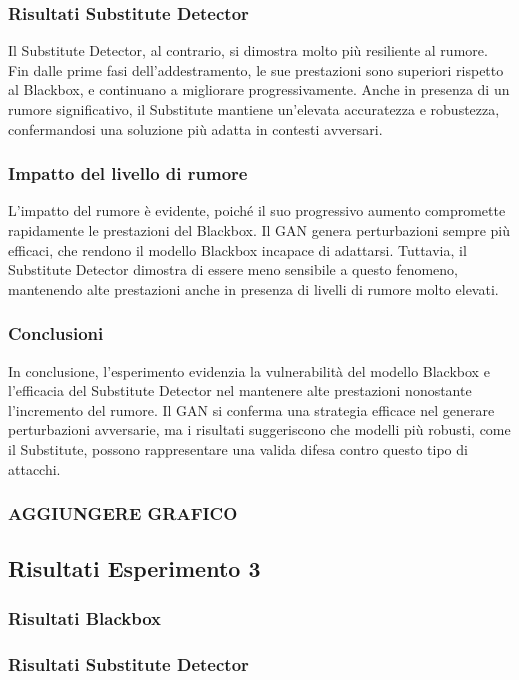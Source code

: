 \subsubsection{Risultati Substitute Detector}
Il Substitute Detector, al contrario, si dimostra molto più resiliente al rumore. Fin dalle prime fasi dell'addestramento, le sue prestazioni sono superiori rispetto al Blackbox, e continuano a migliorare progressivamente. Anche in presenza di un rumore significativo, il Substitute mantiene un'elevata accuratezza e robustezza, confermandosi una soluzione più adatta in contesti avversari.
\subsubsection{Impatto del livello di rumore}
L'impatto del rumore è evidente, poiché il suo progressivo aumento compromette rapidamente le prestazioni del Blackbox. Il GAN genera perturbazioni sempre più efficaci, che rendono il modello Blackbox incapace di adattarsi. Tuttavia, il Substitute Detector dimostra di essere meno sensibile a questo fenomeno, mantenendo alte prestazioni anche in presenza di livelli di rumore molto elevati.
\subsubsection{Conclusioni}
In conclusione, l'esperimento evidenzia la vulnerabilità del modello Blackbox e l'efficacia del Substitute Detector nel mantenere alte prestazioni nonostante l'incremento del rumore. Il GAN si conferma una strategia efficace nel generare perturbazioni avversarie, ma i risultati suggeriscono che modelli più robusti, come il Substitute, possono rappresentare una valida difesa contro questo tipo di attacchi.
\subsubsection{AGGIUNGERE GRAFICO}

\subsection{Risultati Esperimento 3}
\subsubsection{Risultati Blackbox}
\subsubsection{Risultati Substitute Detector}
